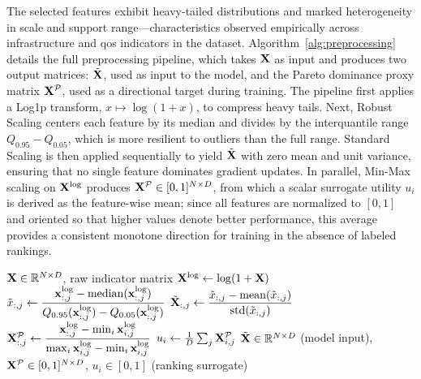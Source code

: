 \documentclass[english]{sbrt}
\begin{document}
The selected features exhibit heavy-tailed distributions and marked
heterogeneity in scale and support range---characteristics observed empirically
across infrastructure and \gls{qos} indicators in the dataset.
Algorithm~\ref{alg:preprocessing} details the full preprocessing pipeline, which
takes $\mathbf{X}$ as input and produces two output matrices: $\tilde{\mathbf{X}}$, used as
input to the model, and the Pareto dominance proxy matrix $\mathbf{X}^{\mathcal{P}}$, used as a
directional target during training. The pipeline first applies a Log1p
transform, $x \mapsto \log(1+x)$, to compress heavy tails. Next, Robust Scaling
centers each feature by its median and divides by the interquantile range
$Q_{0.95} - Q_{0.05}$, which is more resilient to outliers than the full range.
Standard Scaling is then applied sequentially to yield $\tilde{\mathbf{X}}$ with zero mean
and unit variance, ensuring that no single feature dominates gradient updates.
In parallel, Min-Max scaling on $\mathbf{X}^\mathrm{log}$ produces $\mathbf{X}^{\mathcal{P}} \in [0,1]^{N \times
D}$, from which a scalar surrogate utility $u_i$ is derived as the feature-wise
mean; since all features are normalized to $[0,1]$ and oriented so that higher
values denote better performance, this average provides a consistent monotone
direction for training in the absence of labeled rankings.

\begin{algorithm}
  \caption{Preprocessing Pipeline}
  \label{alg:preprocessing}
  \begin{algorithmic}[1]
    \Require $\mathbf{X} \in \mathbb{R}^{N \times D}$, raw indicator matrix
    \State $\mathbf{X}^\mathrm{log} \gets \log(1 + \mathbf{X})$
    \State $\tilde{x}_{:,j} \gets
    \dfrac{\mathbf{x}^\mathrm{log}_{:,j} - \mathrm{median}(\mathbf{x}^\mathrm{log}_{:,j})}
    {Q_{0.95}(\mathbf{x}^\mathrm{log}_{:,j}) - Q_{0.05}(\mathbf{x}^\mathrm{log}_{:,j})}$
    \EndFor
    \State $\tilde{\mathbf{X}}_{:,j} \gets
    \dfrac{\tilde{x}_{:,j} - \mathrm{mean}(\tilde{x}_{:,j})}
    {\mathrm{std}(\tilde{x}_{:,j})}$
    \EndFor
    \State $\mathbf{X}^{\mathcal{P}}_{:,j} \gets
    \dfrac{\mathbf{x}^\mathrm{log}_{:,j} - \min_i \mathbf{x}^\mathrm{log}_{i,j}}
    {\max_i \mathbf{x}^\mathrm{log}_{i,j} - \min_i \mathbf{x}^\mathrm{log}_{i,j}}$
    \EndFor
    \State $u_i \gets \frac{1}{D}\sum_j \mathbf{X}^{\mathcal{P}}_{i,j}$
    \EndFor
    \Ensure $\tilde{\mathbf{X}} \in \mathbb{R}^{N \times D}$ (model input),\;
    $\mathbf{X}^{\mathcal{P}} \in [0,1]^{N \times D}$,\;
    $u_i \in [0,1]$ (ranking surrogate)
  \end{algorithmic}
  \vspace{-1.5em}
\end{algorithm}
\end{document}
